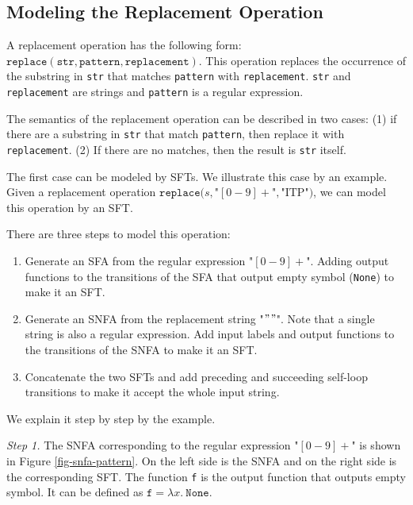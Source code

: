 \documentclass[a4paper,UKenglish,cleveref, autoref, thm-restate]{lipics-v2021}
\begin{document}
\subsection{Modeling the Replacement Operation}


A replacement operation has the following form: $\texttt{replace}(\texttt{str}, \texttt{pattern}, \texttt{replacement})$. This operation replaces the occurrence of the substring in \texttt{str} that matches \texttt{pattern} with \texttt{replacement}. \texttt{str} and \texttt{replacement} are strings and \texttt{pattern} is a regular expression.

The semantics of the replacement operation can be described in two cases: (1) if there are a substring in \texttt{str} that match \texttt{pattern}, then replace it with \texttt{replacement}. (2) If there are no matches, then the result is \texttt{str} itself.

The first case can be modeled by SFTs. We illustrate this case by an example. Given a replacement operation $\texttt{replace}(s, $"$[0-9]+$"$, $"$\text{ITP}$"$)$, we can model this operation by an SFT.

There are three steps to model this operation:

\begin{enumerate}
  \item Generate an SFA from the regular expression "$[0-9]+$". Adding output functions to the transitions of the SFA that output empty symbol (\texttt{None}) to make it an SFT.
  \item Generate an SNFA from the replacement string "$"$$"$". Note that a single string is also a regular expression. Add input labels and output functions to the transitions of the SNFA to make it an SFT.
  \item Concatenate the two SFTs and add preceding and succeeding self-loop transitions to make it accept the whole input string.
\end{enumerate}

We explain it step by step by the example.

\noindent\emph{Step 1.}
The SNFA corresponding to the regular expression "$[0-9]+$" is shown in Figure \ref{fig-snfa-pattern}. On the left side is the SNFA and on the right side is the corresponding SFT. The function \texttt{f} is the output function that outputs empty symbol. It can be defined as $\texttt{f} = \lambda x.~\texttt{None}$. 
\end{document}
